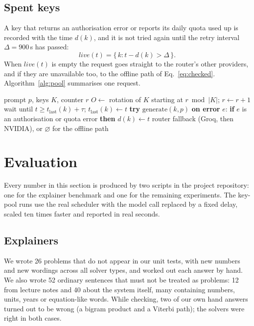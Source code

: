 \documentclass[runningheads]{llncs}
\begin{document}
\subsection{Spent keys}
A key that returns an authorisation error or reports its daily quota used up is recorded with the time $d(k)$, and it is not
tried again until the retry interval $\Delta = 900$\,s has passed:
\begin{equation}
\mathit{live}(t) = \{\, k : t - d(k) > \Delta \,\}.
\end{equation}
When $\mathit{live}(t)$ is empty the request goes straight to the router's other providers, and if they are unavailable too, to
the offline path of Eq.~\ref{eq:checked}. Algorithm~\ref{alg:pool} summarises one request.

\begin{algorithm}[H]
\caption{One diagram request through the key pool}
\label{alg:pool}
\begin{algorithmic}[1]
\Require prompt $p$, keys $K$, counter $r$
\State $O \gets$ rotation of $K$ starting at $r \bmod |K|$; \quad $r \gets r + 1$
  \State wait until $t \ge t_{\text{last}}(k) + \tau$; \quad $t_{\text{last}}(k) \gets t$
  \State \textbf{try} \Return $\mathrm{generate}(k, p)$
  \State \textbf{on error} $e$: \textbf{if} $e$ is an authorisation or quota error \textbf{then} $d(k) \gets t$
\EndFor
\State \Return router fallback (Groq, then NVIDIA), or $\varnothing$ for the offline path
\end{algorithmic}
\end{algorithm}

\section{Evaluation}
\label{sec:eval}
Every number in this section is produced by two scripts in the project repository: one for the explainer benchmark and one for
the remaining experiments. The key-pool runs use the real scheduler with the model call replaced by a fixed delay, scaled ten
times faster and reported in real seconds.

\subsection{Explainers}
We wrote 26 problems that do not appear in our unit tests, with new numbers and new wordings across all solver types, and worked
out each answer by hand. We also wrote 52 ordinary sentences that must not be treated as problems: 12 from lecture notes and 40
about the system itself, many containing numbers, units, years or equation-like words. While checking, two of our own hand
answers turned out to be wrong (a bigram product and a Viterbi path); the solvers were right in both cases.
\end{document}
